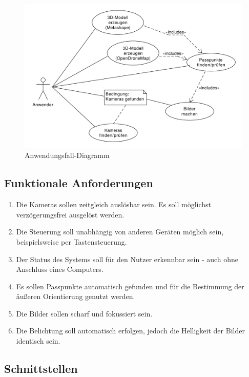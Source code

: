 \documentclass[./00PhotoBox.tex]{subfiles}
\begin{document}
\begin{figure}
    \centering
    \includegraphics[width=1\textwidth]{./img/uml/uml_usecases.pdf}
    \caption{Anwendungsfall-Diagramm}
    \label{img:anwendungsfall}
\end{figure}


\subsection{Funktionale Anforderungen}
\begin{enumerate}[label=F\arabic*]
    \item \label{e:zeitgleich} Die Kameras sollen zeitgleich auslösbar sein. Es soll möglichst ver\-zögerungs\-frei ausgelöst werden.
    \item \label{e:button} Die Steuerung soll unabhängig von anderen Geräten möglich sein, beispielsweise per Tastensteuerung.
    \item \label{e:status} Der Status des Systems soll für den Nutzer erkennbar sein - auch ohne Anschluss eines Computers.
    \item \label{e:passpunkte} Es sollen Passpunkte au\-to\-ma\-tisch gefunden und für die Bestimmung der äußeren Orientierung genutzt werden.
    \item \label{e:scharf} Die Bilder sollen scharf und fokussiert sein.
    \item \label{e:licht} Die Belichtung soll au\-to\-ma\-tisch erfolgen, jedoch die Helligkeit der Bilder identisch sein.
\end{enumerate}

\subsection{Schnittstellen}
\end{document}
